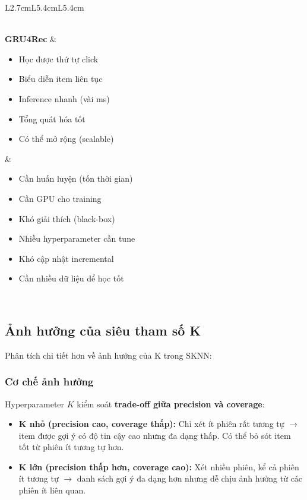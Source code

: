 \documentclass[12pt, a4paper]{article}
\begin{document}
\begin{table}[H]
\begin{tabular}{L{2.7cm}L{5.4cm}L{5.4cm}}
\begin{itemize}[leftmargin=0.3cm, topsep=0pt]
\end{itemize} \\
\midrule
\textbf{GRU4Rec} &
\begin{itemize}[leftmargin=0.3cm, topsep=0pt]
    \item Học được thứ tự click
    \item Biểu diễn item liên tục
    \item Inference nhanh (vài ms)
    \item Tổng quát hóa tốt
    \item Có thể mở rộng (scalable)
\end{itemize} &
\begin{itemize}[leftmargin=0.3cm, topsep=0pt]
    \item Cần huấn luyện (tốn thời gian)
    \item Cần GPU cho training
    \item Khó giải thích (black-box)
    \item Nhiều hyperparameter cần tune
    \item Khó cập nhật incremental
    \item Cần nhiều dữ liệu để học tốt
\end{itemize} \\
\bottomrule
\end{tabular}
\end{table}

\subsection{Ảnh hưởng của siêu tham số K}

Phân tích chi tiết hơn về ảnh hưởng của K trong SKNN:

\subsubsection{Cơ chế ảnh hưởng}

Hyperparameter $K$ kiểm soát \textbf{trade-off giữa precision và coverage}:

\begin{itemize}
    \item \textbf{K nhỏ (precision cao, coverage thấp):} Chỉ xét ít phiên rất tương tự $\rightarrow$ item được gợi ý có độ tin cậy cao nhưng đa dạng thấp. Có thể bỏ sót item tốt từ phiên ít tương tự hơn.
    
    \item \textbf{K lớn (precision thấp hơn, coverage cao):} Xét nhiều phiên, kể cả phiên ít tương tự $\rightarrow$ danh sách gợi ý đa dạng hơn nhưng dễ chịu ảnh hưởng từ các phiên ít liên quan.
\end{itemize}
\end{document}
